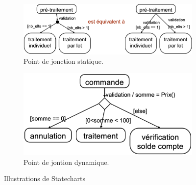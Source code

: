 \begin{figure}[H]
\centering
\begin{subfigure}{0.55\textwidth}
  \includegraphics[width=\textwidth]{./Images/Diagrammes/diagram_statechart_pointjonctionstatique.png}
  \caption{Point de jonction statique.}
  \label{fig:diagram_statechart_pointjonctionstatique}
\end{subfigure}
\begin{subfigure}{0.4\textwidth}
  \includegraphics[width=\textwidth]{./Images/Diagrammes/diagram_statechart_pointjonctiondynamique.png}
  \caption{Point de jontion dynamique.}
  \label{fig:diagram_statechart_pointjonctiondynamique}
\end{subfigure}
\caption{Illustrations de Statecharts}
\label{fig:diagram_statechart_illustrations}
\end{figure}


